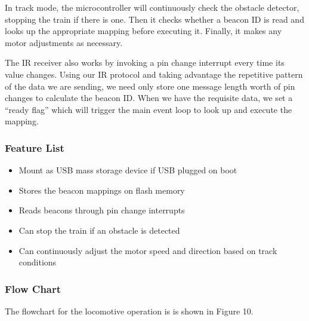 \documentclass[openbib,letterpaper,10pt]{article}
\begin{document}
\begin{spacing}{1.15}
In track mode, the microcontroller will continuously check the obstacle detector, stopping the train if there is one. Then it checks whether a beacon ID is read and looks up the appropriate mapping before executing it. Finally, it makes any motor adjustments as necessary.\par

The IR receiver also works by invoking a pin change interrupt every time its value changes. Using our IR protocol and taking advantage the repetitive pattern of the data we are sending, we need only store one message length worth of pin changes to calculate the beacon ID. When we have the requisite data, we set a “ready flag” which will trigger the main event loop to look up and execute the mapping.

\subsubsection{Feature List}
\begin{itemize}
	\item Mount as USB mass storage device if USB plugged on boot
	\item Stores the beacon mappings on flash memory
	\item Reads beacons through pin change interrupts
	\item Can stop the train if an obstacle is detected
	\item Can continuously adjust the motor speed and direction based on track conditions
\end{itemize}

\subsubsection{Flow Chart}
The flowchart for the locomotive operation is is shown in Figure 10.


\end{spacing}
\end{document}
